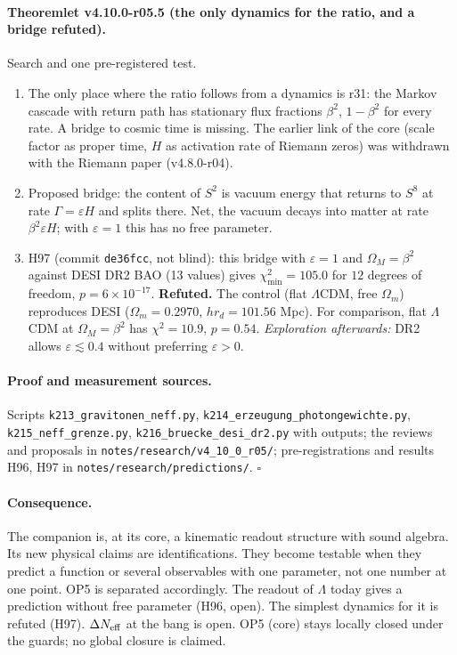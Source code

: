 \paragraph{Theoremlet v4.10.0-r05.5 (the only dynamics for the ratio, and a bridge refuted).}
Search and one pre-registered test.
\begin{enumerate}[leftmargin=2em]
\item[(a)] The only place where the ratio follows from a dynamics is r31: the Markov cascade with return path has stationary flux fractions
\(\beta^2\), \(1-\beta^2\) for every rate.  A bridge to cosmic time is missing.  The earlier link of the core (scale factor as proper time, \(H\) as
activation rate of Riemann zeros) was withdrawn with the Riemann paper (v4.8.0-r04).
\item[(b)] Proposed bridge: the content of \(S^2\) is vacuum energy that returns to \(S^8\) at rate \(\Gamma=\varepsilon H\) and splits there.  Net, the vacuum
decays into matter at rate \(\beta^2\varepsilon H\); with \(\varepsilon=1\) this has no free parameter.
\item[(c)] H97 (commit \texttt{de36fcc}, not blind): this bridge with \(\varepsilon=1\) and \(\Omega_M=\beta^2\) against DESI DR2 BAO (13 values) gives
\(\chi^2_{\min}=105.0\) for \(12\) degrees of freedom, \(p=6\times10^{-17}\).  \textbf{Refuted.}  The control (flat \(\Lambda\)CDM, free \(\Omega_m\)) reproduces DESI
(\(\Omega_m=0.2970\), \(hr_d=101.56\) Mpc).  For comparison, flat \(\Lambda\)CDM at \(\Omega_M=\beta^2\) has \(\chi^2=10.9\), \(p=0.54\).
\emph{Exploration afterwards:} DR2 allows \(\varepsilon\lesssim0.4\) without preferring \(\varepsilon>0\).
\end{enumerate}

\paragraph{Proof and measurement sources.}
Scripts \texttt{k213\_\allowbreak gravitonen\_\allowbreak neff.py}, \texttt{k214\_\allowbreak erzeugung\_\allowbreak photongewichte.py},
\texttt{k215\_\allowbreak neff\_\allowbreak grenze.py}, \texttt{k216\_\allowbreak bruecke\_\allowbreak desi\_\allowbreak dr2.py} with outputs; the reviews and proposals in
\texttt{notes/\allowbreak research/\allowbreak v4\_10\_0\_r05/}; pre-registrations and results H96, H97 in \texttt{notes/\allowbreak research/\allowbreak predictions/}.  \(\square\)

\paragraph{Consequence.}
The companion is, at its core, a kinematic readout structure with sound algebra.  Its new physical claims are identifications.  They become
testable when they predict a function or several observables with one parameter, not one number at one point.  OP5 is separated accordingly.
The readout of \(\Lambda\) today gives a prediction without free parameter (H96, open).  The simplest dynamics for it is refuted (H97).
\(\Delta N_{\rm eff}\) at the bang is open.  OP5 (core) stays locally closed under the guards; no global closure is claimed.

